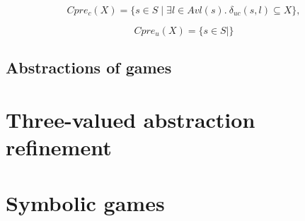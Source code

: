 \documentclass[a4paper,11pt]{article}
\begin{document}
$$Cpre_c(X) = \{s\in S \mid \exists l \in Avl(s).~\delta_{uc}(s,l) 
\subseteq X\},$$

$$Cpre_u(X) = \{s\in S \mid \}$$


\subsection{Abstractions of games}




\section{Three-valued abstraction refinement}

\section{Symbolic games}

\cite{deAlfaro_Roy_07}




\end{document}
